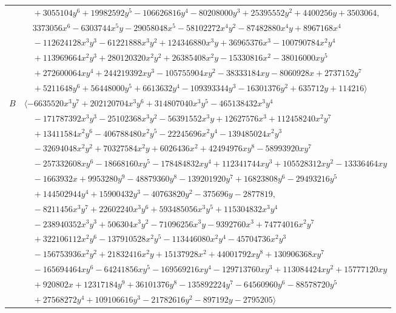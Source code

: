 \documentclass[11pt]{article}
\begin{document}
\begin{longtable}{@{}ll@{}}
 & $\quad +3055104y^{6}+19982592y^{5}-106626816y^{4}-80208000y^{3}+25395552y^{2}+4400256y+3503064,$\\
 & $\quad 3373056x^{6}-6303744x^{5}y-29058048x^{5}-58102272x^{4}y^{2}-87482880x^{4}y+8967168x^{4}$\\
 & $\quad -112624128x^{3}y^{3}-61221888x^{3}y^{2}+124346880x^{3}y+36965376x^{3}-100790784x^{2}y^{4}$\\
 & $\quad +113969664x^{2}y^{3}+280120320x^{2}y^{2}+26385408x^{2}y-15330816x^{2}-38016000xy^{5}$\\
 & $\quad +272600064xy^{4}+244219392xy^{3}-105755904xy^{2}-38333184xy-8060928x+2737152y^{7}$\\
 & $\quad +5211648y^{6}+56448000y^{5}+6613632y^{4}-109393344y^{3}-16301376y^{2}+635712y+114216\rangle$\\
$B$ & $\langle -6635520x^{3}y^{7}+202120704x^{3}y^{6}+314807040x^{3}y^{5}-465138432x^{3}y^{4}$\\
 & $\quad -171787392x^{3}y^{3}-25102368x^{3}y^{2}-56391552x^{3}y+12627576x^{3}+112458240x^{2}y^{7}$\\
 & $\quad +13411584x^{2}y^{6}-406788480x^{2}y^{5}-22245696x^{2}y^{4}-139485024x^{2}y^{3}$\\
 & $\quad -32694048x^{2}y^{2}+70327584x^{2}y+6026436x^{2}+42494976xy^{8}-58993920xy^{7}$\\
 & $\quad -257332608xy^{6}-18668160xy^{5}-178484832xy^{4}+112341744xy^{3}+105528312xy^{2}-13336464xy$\\
 & $\quad -1663932x+9953280y^{9}-48879360y^{8}-139201920y^{7}+16823808y^{6}-29493216y^{5}$\\
 & $\quad +144502944y^{4}+15900432y^{3}-40763820y^{2}-375696y-2877819,$\\
 & $\quad -8211456x^{3}y^{7}+22602240x^{3}y^{6}+593485056x^{3}y^{5}+115304832x^{3}y^{4}$\\
 & $\quad -238940352x^{3}y^{3}+506304x^{3}y^{2}-71096256x^{3}y-9392760x^{3}+74774016x^{2}y^{7}$\\
 & $\quad +322106112x^{2}y^{6}-137910528x^{2}y^{5}-113446080x^{2}y^{4}-45704736x^{2}y^{3}$\\
 & $\quad -156753936x^{2}y^{2}+21832416x^{2}y+15137928x^{2}+44001792xy^{8}+130906368xy^{7}$\\
 & $\quad -165694464xy^{6}-64241856xy^{5}-169569216xy^{4}-129713760xy^{3}+113084424xy^{2}+15777120xy$\\
 & $\quad +920802x+12317184y^{9}+36101376y^{8}-135892224y^{7}-64560960y^{6}-88578720y^{5}$\\
 & $\quad +27568272y^{4}+109106616y^{3}-21782616y^{2}-897192y-2795205\rangle$\\

\end{longtable}
\end{document}
